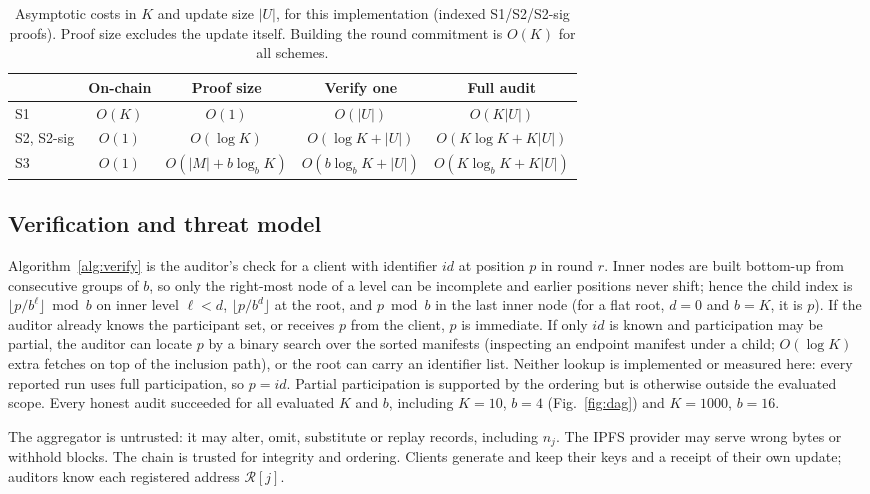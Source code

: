 \documentclass[final,3p,times,twocolumn]{elsarticle}
\begin{document}
\begin{table}[t]
\centering\scriptsize
\caption{Asymptotic costs in $K$ and update size $|U|$, for this implementation (indexed S1/S2/S2-sig proofs). Proof size excludes the update itself. Building the round commitment is $O(K)$ for all schemes.}
\label{tab:complex}
\setlength{\tabcolsep}{2.2pt}
\begin{tabular}{@{}lcccc@{}}
\toprule
 & On-chain & Proof size & Verify one & Full audit\\
\midrule
S1 & $O(K)$ & $O(1)$ & $O(|U|)$ & $O(K|U|)$\\
S2, S2-sig & $O(1)$ & $O(\log K)$ & $O(\log K{+}|U|)$ & $O(K\log K{+}K|U|)$\\
S3 & $O(1)$ & $O(|M|{+}b\log_b K)$ & $O(b\log_b K{+}|U|)$ & $O(K\log_b K{+}K|U|)$\\
\bottomrule
\end{tabular}
\end{table}

\subsection{Verification and threat model}
Algorithm~\ref{alg:verify} is the auditor's check for a client with identifier $\mathit{id}$ at position $p$ in round $r$. Inner nodes are built bottom-up from consecutive groups of $b$, so only the right-most node of a level can be incomplete and earlier positions never shift; hence the child index is $\lfloor p/b^{\ell}\rfloor \bmod b$ on inner level $\ell<d$, $\lfloor p/b^{d}\rfloor$ at the root, and $p \bmod b$ in the last inner node (for a flat root, $d=0$ and $b=K$, it is $p$). If the auditor already knows the participant set, or receives $p$ from the client, $p$ is immediate. If only $\mathit{id}$ is known and participation may be partial, the auditor can locate $p$ by a binary search over the sorted manifests (inspecting an endpoint manifest under a child; $O(\log K)$ extra fetches on top of the inclusion path), or the root can carry an identifier list. Neither lookup is implemented or measured here: every reported run uses full participation, so $p=\mathit{id}$. Partial participation is supported by the ordering but is otherwise outside the evaluated scope. Every honest audit succeeded for all evaluated $K$ and $b$, including $K=10$, $b=4$ (Fig.~\ref{fig:dag}) and $K=1000$, $b=16$.

The aggregator is untrusted: it may alter, omit, substitute or replay records, including $n_j$. The IPFS provider may serve wrong bytes or withhold blocks. The chain is trusted for integrity and ordering. Clients generate and keep their keys and a receipt of their own update; auditors know each registered address $\mathcal{R}[j]$.
\end{document}
